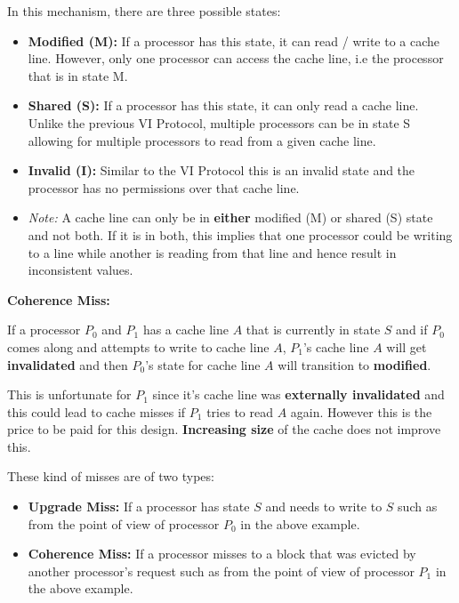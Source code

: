 \documentclass[12pt]{article}
\newenvironment{QandA}{\begin{enumerate}[label=\bfseries\arabic*.]\bfseries}
                      {\end{enumerate}}
\newenvironment{answered}{\par\quad\normalfont}{}
\begin{document}
\begin{QandA}
\begin{answered}
In this mechanism, there are three possible states:
\begin{itemize}
    \item \textbf{Modified (M):} If a processor has this state, it can read / write to a cache line. However, only one processor can access the cache line, i.e the processor that is in state M.
    \item \textbf{Shared (S):} If a processor has this state, it can only read a cache line. Unlike the previous VI Protocol, multiple processors can be in state S allowing for multiple processors to read from a given cache line.
    \item \textbf{Invalid (I):} Similar to the VI Protocol this is an invalid state and the processor has no permissions over that cache line.
    \item \textit{Note:} A cache line can only be in \textbf{either} modified (M) or shared (S) state and not both. If it is in both, this implies that one processor could be writing to a line while another is reading from that line and hence result in inconsistent values. 
\end{itemize}

\textbf{Coherence Miss:}

If a processor $P_{0}$ and $P_{1}$ has a cache line $A$ that is currently in state $S$ and if $P_{0}$ comes along and attempts to write to cache line $A$, $P_{1}$'s cache line $A$ will get \textbf{invalidated} and then $P_{0}$'s state for cache line $A$ will transition to \textbf{modified}. 

This is unfortunate for $P_{1}$ since it's cache line was \textbf{externally invalidated} and this could lead to cache misses if $P_{1}$ tries to read $A$ again. However this is the price to be paid for this design. \textbf{Increasing size} of the cache does not improve this.

These kind of misses are of two types:
\begin{itemize}
    \item \textbf{Upgrade Miss:} If a processor has state $S$ and needs to write to $S$ such as from the point of view of processor $P_{0}$ in the above example.
    \item \textbf{Coherence Miss:} If a processor misses to a block that was evicted by another processor's request such as from the point of view of processor $P_{1}$ in the above example. 
\end{itemize}
\end{answered}


\end{QandA}
\end{document}
